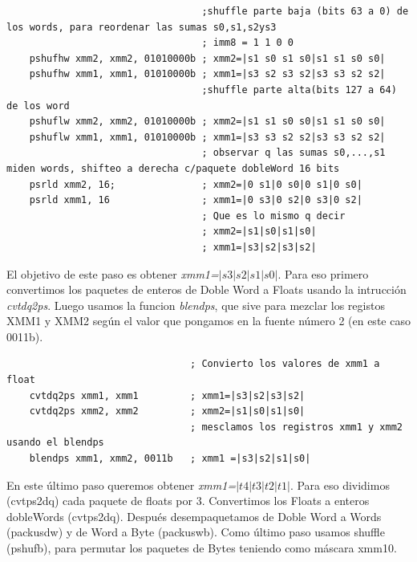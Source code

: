 \begin{codesnippet}
\begin{verbatim}
                                  ;shuffle parte baja (bits 63 a 0) de los words, para reordenar las sumas s0,s1,s2ys3
                                  ; imm8 = 1 1 0 0
    pshufhw xmm2, xmm2, 01010000b ; xmm2=|s1 s0 s1 s0|s1 s1 s0 s0| 
    pshufhw xmm1, xmm1, 01010000b ; xmm1=|s3 s2 s3 s2|s3 s3 s2 s2|
                                  ;shuffle parte alta(bits 127 a 64) de los word
    pshuflw xmm2, xmm2, 01010000b ; xmm2=|s1 s1 s0 s0|s1 s1 s0 s0|
    pshuflw xmm1, xmm1, 01010000b ; xmm1=|s3 s3 s2 s2|s3 s3 s2 s2|
                                  ; observar q las sumas s0,...,s1 miden words, shifteo a derecha c/paquete dobleWord 16 bits
    psrld xmm2, 16;               ; xmm2=|0 s1|0 s0|0 s1|0 s0| 
    psrld xmm1, 16                ; xmm1=|0 s3|0 s2|0 s3|0 s2| 
								  ; Que es lo mismo q decir
                                  ; xmm2=|s1|s0|s1|s0|
                                  ; xmm1=|s3|s2|s3|s2|
\end{verbatim}
\end{codesnippet}

El objetivo de este paso es obtener \emph{xmm1=$|s3|s2|s1|s0|$}. Para eso primero convertimos los paquetes de enteros de Doble Word a Floats usando la intrucción \emph{cvtdq2ps}. Luego usamos la funcion \emph{blendps}, que sive para mezclar los registos XMM1 y XMM2 según el valor que pongamos en la fuente número 2 (en este caso 0011b).

\begin{codesnippet}
\begin{verbatim}
                                ; Convierto los valores de xmm1 a float
    cvtdq2ps xmm1, xmm1         ; xmm1=|s3|s2|s3|s2|
    cvtdq2ps xmm2, xmm2         ; xmm2=|s1|s0|s1|s0|
                                ; mesclamos los registros xmm1 y xmm2 usando el blendps
    blendps xmm1, xmm2, 0011b   ; xmm1 =|s3|s2|s1|s0|
\end{verbatim}
\end{codesnippet}

En este último paso queremos obtener \emph{xmm1=$|t4|t3|t2|t1|$}. Para eso dividimos (cvtps2dq) cada paquete de floats por 3. Convertimos los Floats a enteros dobleWords (cvtps2dq). Después desempaquetamos de Doble Word a Words (packusdw) y de Word a Byte (packuswb). Como último paso usamos shuffle (pshufb), para permutar los paquetes de Bytes teniendo como máscara xmm10. 

